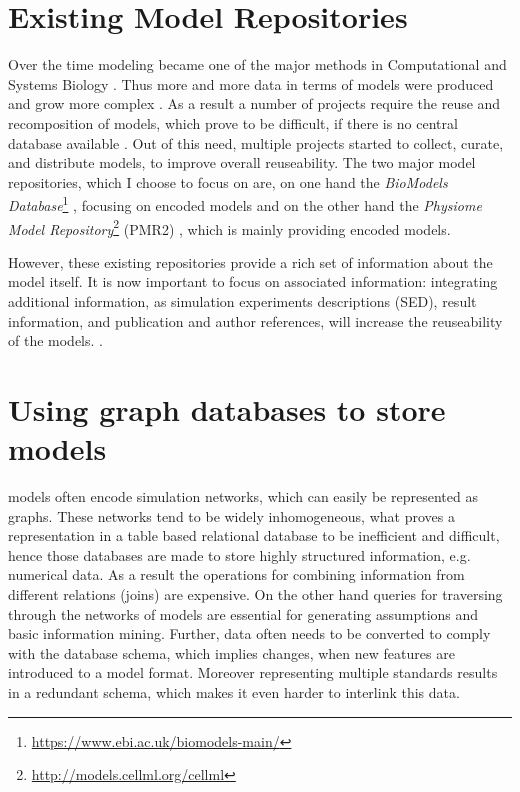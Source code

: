 \section{Existing Model Repositories}
\label{sec:background:modelrepo}
Over the time modeling became one of the major methods in Computational and Systems Biology \citep{Finkelstein2004}. Thus more and more data in terms of models were produced and grow more complex \citep{Henkel2010}. As a result a number of projects require the reuse and recomposition of models, which prove to be difficult, if there is no central database available \citep{Waltemath2013}.
Out of this need, multiple projects started to collect, curate, and distribute models, to improve overall reuseability.
The two major model repositories, which I choose to focus on are, on one hand the \emph{BioModels Database}\footnote{\url{https://www.ebi.ac.uk/biomodels-main/}} \citep{Li2010}, focusing on \sbml encoded models and on the other hand the \emph{Physiome Model Repository}\footnote{\url{http://models.cellml.org/cellml}} (PMR2) \citep{Yu2011}, which is mainly providing \cellml encoded models.

However, these existing repositories provide a rich set of information about the model itself. It is now important to focus on associated information: integrating additional information, as simulation experiments descriptions (SED), result information, and publication and author references, will increase the reuseability of the models. \citep{Waltemath2013,Henkel2012}.

\section{Using graph databases to store \sysbio models}
\label{sec:backgroung:graph-db}
\sysbio models often encode simulation networks, which can easily be represented as graphs. These networks tend to be widely inhomogeneous, what proves a representation in a table based relational database to be inefficient and difficult, hence those databases are made to store highly structured information, e.g. numerical data. As a result the operations for combining information from different relations (joins) are expensive. On the other hand queries for traversing through the networks of models are essential for generating assumptions and basic information mining.
Further, data often needs to be converted to comply with the database schema, which implies changes, when new features are introduced to a model format. Moreover representing multiple standards results in a redundant schema, which makes it even harder to interlink this data. \citep{Lysenko2016}

